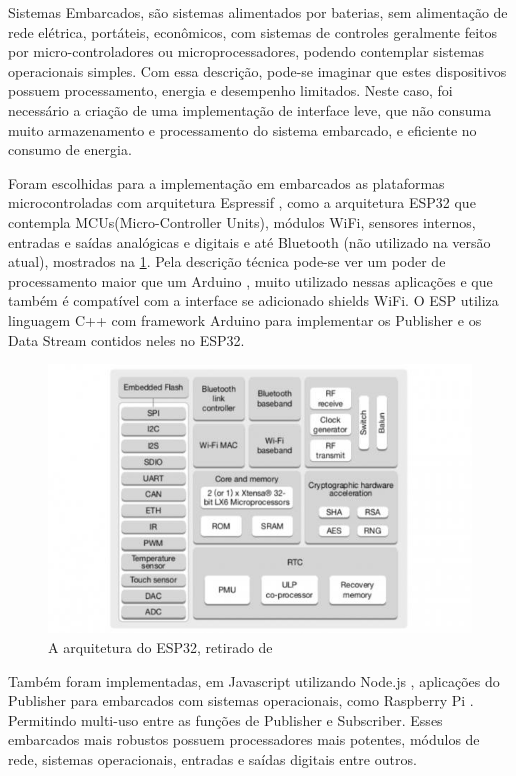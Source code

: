 Sistemas Embarcados, são sistemas alimentados por baterias, sem alimentação de rede elétrica, portáteis, econômicos, com sistemas de controles geralmente feitos por micro-controladores ou microprocessadores, podendo contemplar sistemas operacionais simples. Com essa descrição, pode-se imaginar que estes dispositivos possuem processamento, energia e desempenho limitados. Neste caso, foi necessário a criação de uma implementação de interface leve, que não consuma muito armazenamento e processamento do sistema embarcado, e eficiente no consumo de energia.

Foram escolhidas para a implementação em embarcados as plataformas microcontroladas com arquitetura Espressif \cite{espressif}, como a arquitetura ESP32 que contempla MCUs(Micro-Controller Units), módulos WiFi, sensores internos, entradas e saídas analógicas e digitais e até Bluetooth (não utilizado na versão atual), mostrados na \ref{fig:3.3.4/esp32-arch}. Pela descrição técnica pode-se ver um poder de processamento maior que um Arduino \cite{arduino}, muito utilizado nessas aplicações e que também é compatível com a interface se adicionado shields WiFi. O ESP utiliza linguagem C++ \cite{c++} com framework Arduino para implementar os Publisher e os Data Stream contidos neles no ESP32.

\begin{figure}[h!]
\centering
\includegraphics[width=13cm]{./02_Capitulos/02_Cap3/figures/espressif32-arch}
\caption{A arquitetura do ESP32, retirado de \cite{espressif}}
\label{fig:3.3.4/esp32-arch}
\end{figure}


Também foram implementadas, em Javascript  utilizando Node.js \cite{nodejs}, aplicações do Publisher para embarcados com sistemas operacionais, como Raspberry Pi \cite{raspberry-pi}. Permitindo multi-uso entre as funções de Publisher e Subscriber. Esses embarcados mais robustos possuem processadores mais potentes, módulos de rede, sistemas operacionais, entradas e saídas digitais entre outros.


